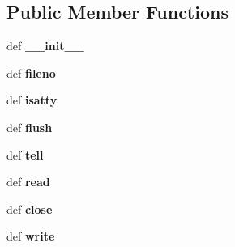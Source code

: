 \subsection*{Public Member Functions}
\begin{DoxyCompactItemize}
\item 
\hypertarget{classcheshire3_1_1grid_1_1srboo_1_1_srb_file_a3cf4fb2763089539a1e765bedd12f2f5}{def {\bfseries \-\_\-\-\_\-init\-\_\-\-\_\-}}\label{classcheshire3_1_1grid_1_1srboo_1_1_srb_file_a3cf4fb2763089539a1e765bedd12f2f5}

\item 
\hypertarget{classcheshire3_1_1grid_1_1srboo_1_1_srb_file_abcb8a095b1085f79fb193a442461975e}{def {\bfseries fileno}}\label{classcheshire3_1_1grid_1_1srboo_1_1_srb_file_abcb8a095b1085f79fb193a442461975e}

\item 
\hypertarget{classcheshire3_1_1grid_1_1srboo_1_1_srb_file_acb79fc5ce758a6318209312b337867cc}{def {\bfseries isatty}}\label{classcheshire3_1_1grid_1_1srboo_1_1_srb_file_acb79fc5ce758a6318209312b337867cc}

\item 
\hypertarget{classcheshire3_1_1grid_1_1srboo_1_1_srb_file_ae1a4bac4d361d71f9ec82d6c303d1747}{def {\bfseries flush}}\label{classcheshire3_1_1grid_1_1srboo_1_1_srb_file_ae1a4bac4d361d71f9ec82d6c303d1747}

\item 
\hypertarget{classcheshire3_1_1grid_1_1srboo_1_1_srb_file_ab83b366f418adfbb44ceb7edfbb2694a}{def {\bfseries tell}}\label{classcheshire3_1_1grid_1_1srboo_1_1_srb_file_ab83b366f418adfbb44ceb7edfbb2694a}

\item 
\hypertarget{classcheshire3_1_1grid_1_1srboo_1_1_srb_file_aafb87bf914da53e6c4d51fff37e006ed}{def {\bfseries read}}\label{classcheshire3_1_1grid_1_1srboo_1_1_srb_file_aafb87bf914da53e6c4d51fff37e006ed}

\item 
\hypertarget{classcheshire3_1_1grid_1_1srboo_1_1_srb_file_a4576cb29014fa3621f03148f29e4d7b6}{def {\bfseries close}}\label{classcheshire3_1_1grid_1_1srboo_1_1_srb_file_a4576cb29014fa3621f03148f29e4d7b6}

\item 
\hypertarget{classcheshire3_1_1grid_1_1srboo_1_1_srb_file_a985aff9b25c5a55c78a92ab01477665f}{def {\bfseries write}}\label{classcheshire3_1_1grid_1_1srboo_1_1_srb_file_a985aff9b25c5a55c78a92ab01477665f}


\end{DoxyCompactItemize}
